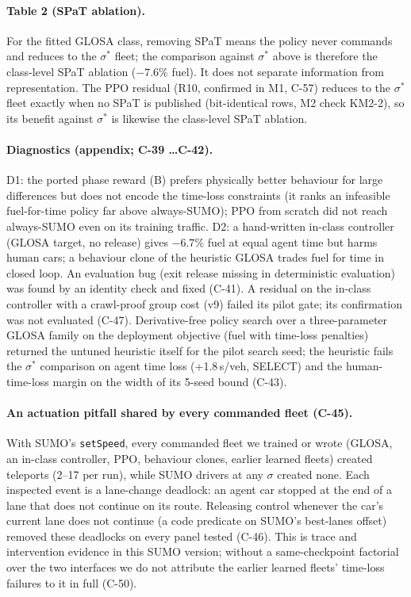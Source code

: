 \documentclass[11pt]{article}
\begin{document}
\paragraph{Table 2 (SPaT ablation).} For the fitted GLOSA class, removing SPaT means the policy never commands and reduces to the
$\sigma^*$ fleet; the comparison against $\sigma^*$ above is therefore the class-level SPaT ablation ($-7.6\%$ fuel). It does not separate
information from representation. The PPO residual (R10, confirmed in M1, C-57) reduces to the $\sigma^*$ fleet exactly when no SPaT is
published (bit-identical rows, M2 check KM2-2), so its benefit against $\sigma^*$ is likewise the class-level SPaT ablation.
\paragraph{Diagnostics (appendix; C-39 \dots C-42).} D1: the ported phase reward (B) prefers physically better behaviour for large
differences but does not encode the time-loss constraints (it ranks an infeasible fuel-for-time policy far above always-SUMO); PPO from
scratch did not reach always-SUMO even on its training traffic. D2: a hand-written in-class controller (GLOSA target, no release) gives
$-6.7\%$ fuel at equal agent time but harms human cars; a behaviour clone of the heuristic GLOSA trades fuel for time in closed loop.
An evaluation bug (exit release missing in deterministic evaluation) was found by an identity check and fixed (C-41).
A residual on the in-class controller with a crawl-proof group cost (v9) failed its pilot gate; its confirmation was not evaluated (C-47).
Derivative-free policy search over a three-parameter GLOSA family on the deployment objective (fuel with time-loss penalties) returned
the untuned heuristic itself for the pilot search seed; the heuristic fails the $\sigma^*$ comparison on agent time loss (+1.8\,s/veh,
SELECT) and the human-time-loss margin on the width of its 5-seed bound (C-43).
\paragraph{An actuation pitfall shared by every commanded fleet (C-45).} With SUMO's \texttt{setSpeed}, every commanded fleet we
trained or wrote (GLOSA, an in-class controller, PPO, behaviour clones, earlier learned fleets) created teleports (2--17 per run), while
SUMO drivers at any $\sigma$ created none. Each inspected event is a lane-change deadlock: an agent car stopped at the end of a lane that does
not continue on its route. Releasing control whenever the car's current lane does not continue (a code predicate on SUMO's best-lanes
offset) removed these deadlocks on every panel tested (C-46). This is trace and intervention evidence in this SUMO version; without a
same-checkpoint factorial over the two interfaces we do not attribute the earlier learned fleets' time-loss failures to it in full (C-50).
\end{document}
